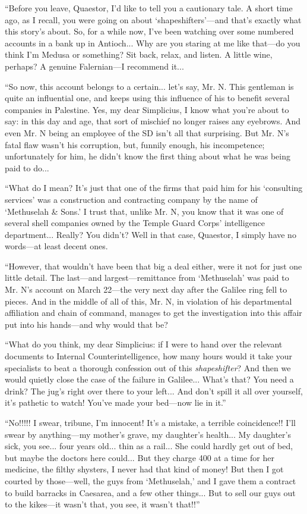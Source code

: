 ``Before you leave, Quaestor, I'd like to tell you a cautionary tale. A short time ago, as I recall, you were going on about `shapeshifters'---and that's exactly what this story's about. So, for a while now, I've been watching over some numbered accounts in a bank up in Antioch... Why are you staring at me like that---do you think I'm Medusa or something? Sit back, relax, and listen. A little wine, perhaps? A genuine Falernian---I recommend it...

``So now, this account belongs to a certain... let's say, Mr. N. This gentleman is quite an influential one, and keeps using this influence of his to benefit several companies in Palestine. Yes, my dear Simplicius, I know what you're about to say: in this day and age, that sort of mischief no longer raises any eyebrows. And even Mr. N being an employee of the SD isn't all that surprising. But Mr. N's fatal flaw wasn't his corruption, but, funnily enough, his incompetence; unfortunately for him, he didn't know the first thing about what he was being paid to do...

``What do I mean? It's just that one of the firms that paid him for his `consulting services' was a construction and contracting company by the name of `Methuselah \& Sons.' I trust that, unlike Mr. N, you know that it was one of several shell companies owned by the Temple Guard Corps' intelligence department... Really? You didn't? Well in that case, Quaestor, I simply have no words---at least decent ones.

``However, that wouldn't have been that big a deal either, were it not for just one little detail. The last---and largest---remittance from `Methuselah' was paid to Mr. N's account on March 22---the very next day after the Galilee ring fell to pieces. And in the middle of all of this, Mr. N, in violation of his departmental affiliation and chain of command, manages to get the investigation into this affair put into his hands---and why would that be?

``What do you think, my dear Simplicius: if I were to hand over the relevant documents to Internal Counterintelligence, how many hours would it take your specialists to beat a thorough confession out of this \emph{shapeshifter}? And then we would quietly close the case of the failure in Galilee... What's that? You need a drink? The jug's right over there to your left... And don't spill it all over yourself, it's pathetic to watch! You've made your bed---now lie in it.''

``No!!!!! I swear, tribune, I'm innocent! It's a mistake, a terrible coincidence!! I'll swear by anything---my mother's grave, my daughter's health... My daughter's sick, you see... four years old... thin as a rail... She could hardly get out of bed, but maybe the doctors here could... But they charge 400 at a time for her medicine, the filthy shysters, I never had that kind of money! But then I got courted by those---well, the guys from `Methuselah,' and I gave them a contract to build barracks in Caesarea, and a few other things... But to sell our guys out to the kikes---it wasn't that, you see, it wasn't that!!''

